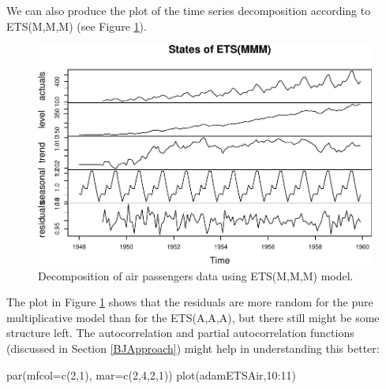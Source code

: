 \documentclass[
]{book}
\newenvironment{Shaded}{\begin{snugshade}}{\end{snugshade}}
\newcommand{\AttributeTok}[1]{\textcolor[rgb]{0.77,0.63,0.00}{#1}}
\newcommand{\DecValTok}[1]{\textcolor[rgb]{0.00,0.00,0.81}{#1}}
\newcommand{\FunctionTok}[1]{\textcolor[rgb]{0.00,0.00,0.00}{#1}}
\newcommand{\NormalTok}[1]{#1}
\newcommand{\SpecialCharTok}[1]{\textcolor[rgb]{0.00,0.00,0.00}{#1}}
\theoremstyle{definition}
\theoremstyle{definition}
\theoremstyle{definition}
\theoremstyle{definition}
\theoremstyle{remark}
\begin{document}
We can also produce the plot of the time series decomposition according to ETS(M,M,M) (see Figure \ref{fig:AirPassengersMMMDecomposition}).

\begin{figure}
\centering
\includegraphics{Svetunkov--2022----ADAM_files/figure-latex/AirPassengersMMMDecomposition-1.pdf}
\caption{\label{fig:AirPassengersMMMDecomposition}Decomposition of air passengers data using ETS(M,M,M) model.}
\end{figure}

The plot in Figure \ref{fig:AirPassengersMMMDecomposition} shows that the residuals are more random for the pure multiplicative model than for the ETS(A,A,A), but there still might be some structure left. The autocorrelation and partial autocorrelation functions (discussed in Section \ref{BJApproach}) might help in understanding this better:

\begin{Shaded}
\begin{Highlighting}[]
\FunctionTok{par}\NormalTok{(}\AttributeTok{mfcol=}\FunctionTok{c}\NormalTok{(}\DecValTok{2}\NormalTok{,}\DecValTok{1}\NormalTok{), }\AttributeTok{mar=}\FunctionTok{c}\NormalTok{(}\DecValTok{2}\NormalTok{,}\DecValTok{4}\NormalTok{,}\DecValTok{2}\NormalTok{,}\DecValTok{1}\NormalTok{))}
\FunctionTok{plot}\NormalTok{(adamETSAir,}\DecValTok{10}\SpecialCharTok{:}\DecValTok{11}\NormalTok{)}
\end{Highlighting}
\end{Shaded}
\end{document}
